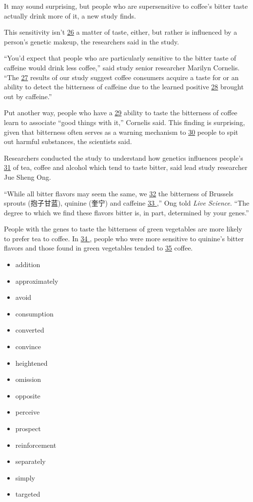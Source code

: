 \documentclass[UTF8,11pt]{ctexart}
\begin{document}
It may sound surprising, but people who are supersensitive to coffee’s bitter taste actually drink more of it, a new study finds.


This sensitivity isn’t \uline{26} a matter of taste, either, but rather is influenced by a person’s genetic makeup, the researchers said in the study.


“You’d expect that people who are particularly sensitive to the bitter taste of caffeine would drink less coffee,” said study senior researcher Marilyn Cornelis. “The \uline{27} results of our study suggest coffee consumers acquire a taste for or an ability to detect the bitterness of caffeine due to the learned positive \uline{28} brought out by caffeine.”


Put another way, people who have a \uline{29} ability to taste the bitterness of coffee learn to associate “good things with it,” Cornelis said. This finding is surprising, given that bitterness often serves as a warning mechanism to \uline{30} people to spit out harmful substances, the scientists said.


Researchers conducted the study to understand how genetics influences people’s \uline{31} of tea, coffee and alcohol which tend to taste bitter, said lead study researcher Jue Sheng Ong.


“While all bitter flavors may seem the same, we \uline{32} the bitterness of Brussels sprouts (抱子甘蓝), quinine (奎宁) and caffeine \uline{33 },” Ong told \textit{Live Science}. “The degree to which we find these flavors bitter is, in part, determined by your genes.”


People with the genes to taste the bitterness of green vegetables are more likely to prefer tea to coffee. In \uline{34 }, people who were more sensitive to quinine’s bitter flavors and those found in green vegetables tended to \uline{35} coffee.


\begin{itemize}[leftmargin=2em,itemsep=.2em,topsep=.4em]\item[A.] addition
\item[B.] approximately
\item[C.] avoid
\item[D.] consumption
\item[E.] converted
\item[F.] convince
\item[G.] heightened
\item[H.] omission
\item[I.] opposite
\item[J.] perceive
\item[K.] prospect
\item[L.] reinforcement
\item[M.] separately
\item[N.] simply
\item[O.] targeted
\end{itemize}
\end{document}
